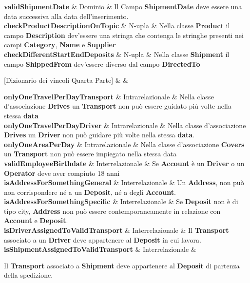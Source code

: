 {  \textbf{validShipmentDate} & Dominio & 
  {\footnotesize
  Il Campo \textbf{ShipmentDate} deve essere una data successiva alla data dell'inserimento.
  }\\

  \textbf{checkProductDescriptionOnTopic} & N-upla &
  {\footnotesize
  Nella classe \textbf{Product} il campo \textbf{Description} dev'essere una stringa che contenga le stringhe presenti nei campi \textbf{Category}, \textbf{Name} e \textbf{Supplier}
  }\\

  \textbf{checkDifferentStartEndDeposits} & N-upla &
  {\footnotesize
  Nella classe \textbf{Shipment} il campo \textbf{ShippedFrom} dev'essere diverso dal campo \textbf{DirectedTo}
  }\\
  
}

[Dizionario dei vincoli Quarta Parte]{ &  & }{
  

  \textbf{onlyOneTravelPerDayTransport} & Intrarelazionale & 
  {\footnotesize
  Nella classe d’associazione \textbf{Drives} un \textbf{Transport} non può essere guidato più volte nella stessa \textbf{data}
  }\\

  \textbf{onlyOneTravelPerDayDriver} & Intrarelazionale &
  {\footnotesize
  Nella classe d’associazione \textbf{Drives} un \textbf{Driver} non può guidare più volte nella stessa \textbf{data}.
  }\\

  \textbf{onlyOneAreaPerDay} & Intrarelazionale & 
  {\footnotesize    
  Nella classe d’associazione \textbf{Covers} un \textbf{Transport} non può essere impiegato nella stessa data
  }\\

  \textbf{validEmployeeBirthdate} & Interrelazionale &
  {\footnotesize
  Se \textbf{Account} è un \textbf{Driver} o un \textbf{Operator} deve aver compiuto 18 anni
  }\\

  \textbf{isAddressForSomethingGeneral}\label{isAddressForSomethingGeneral} & Interrelazionale &
  {\footnotesize
  Un \textbf{Address}, non può non corrispondere né a un \textbf{Deposit}, né a degli \textbf{Account}.
  }\\

  \textbf{isAddressForSomethingSpecific} & Interrelazionale &
  {\footnotesize
  Se \textbf{Deposit} non è di tipo city, \textbf{Address} non può essere contemporaneamente in relazione con \textbf{Account} e \textbf{Deposit}. 
  }\\

  \textbf{isDriverAssignedToValidTransport} & Interrelazionale &
  {\footnotesize
  Il \textbf{Transport} associato a un \textbf{Driver} deve appartenere al \textbf{Deposit} in cui lavora.
  }\\

  \textbf{isShipmentAssignedToValidTransport} & Interrelazionale &
  {\footnotesize

  Il \textbf{Transport } associato a \textbf{Shipment} deve appartenere al \textbf{Deposit} di partenza della spedizione.
  }\\
}

